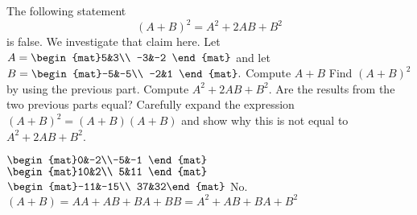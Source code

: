 
\begin{Exercise}[
name={},
title={}, 
difficulty=0,
origin={\cite{GH}}]
The following statement 
\[
(A+B)^2=A^2+2AB+B^2
\]
is false.  We investigate that claim here.
\Question Let $A=\begin{mat}5&3\\  -3&-2 \end{mat}$ and let $B=\begin{mat}-5&-5\\  -2&1 \end{mat}.$ Compute $A+B$
\Question Find $(A+B)^2$ by using the previous part.
\Question Compute $A^2+2AB+B^2$.
\Question Are the results from the two previous parts equal?
\Question Carefully expand the expression $(A+B)^2 = (A+B)(A+B)$ and show why this is not equal to $A^2+2AB+B^2$.
\end{Exercise}

\begin{Answer}
\Question $\begin{mat}0&-2\\-5&-1 \end{mat}$
\Question $\begin{mat}10&2\\  5&11 \end{mat}$
\Question $\begin{mat}-11&-15\\  37&32\end{mat}$
\Question No.
\Question $(A+B)=AA+AB+BA+BB=A^2+AB+BA+B^2$
\end{Answer}
